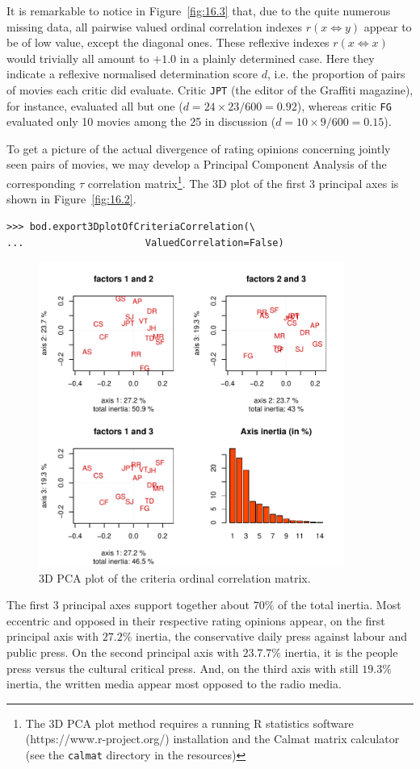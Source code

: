 It is remarkable to notice in Figure~\vref{fig:16.3} that, due to the quite numerous missing data, all pairwise valued ordinal correlation indexes $r(x\Leftrightarrow y)$ appear to be of low value, except the diagonal ones. These reflexive indexes $r(x\Leftrightarrow x)$ would trivially all amount to $+1.0$ in a plainly determined case. Here they indicate a reflexive normalised determination score $d$, i.e. the proportion of pairs of movies each critic did evaluate. Critic \texttt{JPT} (the editor of the Graffiti magazine), for instance, evaluated all but one ($d = 24\times23/600 = 0.92$), whereas critic \texttt{FG} evaluated only 10 movies among the 25 in discussion ($d = 10\times9/600 = 0.15$).

To get a picture of the actual divergence of rating opinions concerning jointly seen pairs of movies, we may develop a Principal Component Analysis of the corresponding $\tau$ correlation matrix\footnote{The 3D PCA plot method requires a running R statistics software  (https://www.r-project.org/) installation and the Calmat matrix calculator (see the \texttt{calmat} directory in the \Digraph resources)}. The 3D plot of the first 3 principal axes is shown in Figure~\vref{fig:16.2}.
\begin{lstlisting}
>>> bod.export3DplotOfCriteriaCorrelation(\
...                     ValuedCorrelation=False)
\end{lstlisting}
\begin{figure}[ht]
\includegraphics[width=10cm]{Figures/16-4-correlationPCA.pdf}
\caption{3D PCA plot of the criteria ordinal correlation matrix.}
\label{fig:16.4}       %
\end{figure}
The first 3 principal axes support together about $70\%$ of the total inertia. Most eccentric and opposed in their respective rating opinions appear, on the first principal axis with $27.2\%$ inertia, the conservative daily press against labour and public press. On the second principal axis with $23.7.7\%$ inertia, it is the people press versus the cultural critical press. And, on the third axis with still $19.3\%$ inertia, the written media appear most opposed to the radio media.

